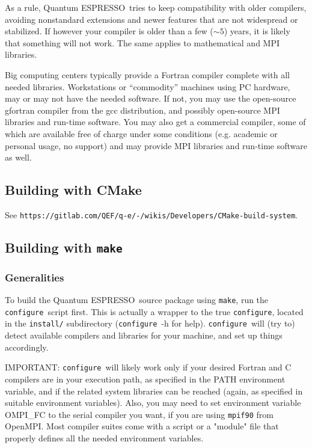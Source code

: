 \documentclass[12pt,a4paper]{article}
\def\qe{{\sc Quantum ESPRESSO}}
\def\configure{\texttt{configure}}
\def\make{\texttt{make}}
\begin{document}
As a rule, \qe\ tries to keep compatibility with older compilers,
avoiding nonstandard extensions and newer features that are not
widespread or stabilized. If however your compiler is older than
a few ($\sim 5$) years, it is likely that something will not work.
The same applies to mathematical and MPI libraries.

Big computing centers typically provide a Fortran compiler complete
with all needed libraries. Workstations or ``commodity'' machines
using PC hardware, may or may not have the needed software. If not,
you may use the open-source gfortran compiler from the gcc distribution,
and possibly open-source MPI libraries and run-time software. You may 
also get a commercial compiler, some of which are available free of charge 
under some conditions (e.g. academic or personal usage, no support) and may 
provide MPI libraries and run-time software as well.

\subsection{Building with CMake}

See \texttt{https://gitlab.com/QEF/q-e/-/wikis/Developers/CMake-build-system}.

\subsection{Building with \make}

\subsubsection{Generalities}
To build the \qe\ source package using \make, run the \configure{}ript first. This is actually a wrapper to the true \configure,
located in the \texttt{install/} subdirectory (\configure\ -h for help).
\configure\ will (try to) detect available compilers and libraries for
your machine, and set up things accordingly.

IMPORTANT: \configure\ will likely work only if your desired Fortran and 
C compilers are in your execution path, as specified in the PATH environment 
variable, and if the related system libraries can be reached (again,
as specified in suitable environment variables). Also, you may need to set 
environment variable OMPI\_FC to the serial compiler you want, if you are
using \texttt{mpif90} from OpenMPI. Most compiler suites come with a script
or a "module" file that properly defines all the needed environment variables. 
\end{document}
